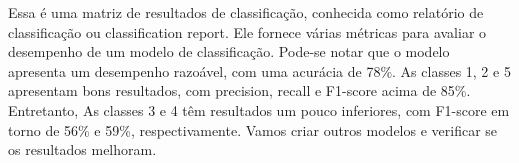 \documentclass[12pt,oneside,a4paper,chapter=TITLE,
			   english,brazil]{abntex2}
\begin{document}
Essa é uma matriz de resultados de classificação, conhecida como relatório de classificação ou classification report. Ele fornece várias métricas para avaliar o desempenho de um modelo de classificação.  Pode-se notar que o modelo apresenta um desempenho razoável, com uma acurácia de 78\%. As classes 1, 2 e 5 apresentam bons resultados, com precision, recall e F1-score acima de 85\%. Entretanto, As classes 3 e 4 têm resultados um pouco inferiores, com F1-score em torno de 56\% e 59\%, respectivamente.  Vamos criar outros modelos e verificar se os resultados melhoram.

 







\end{document}
